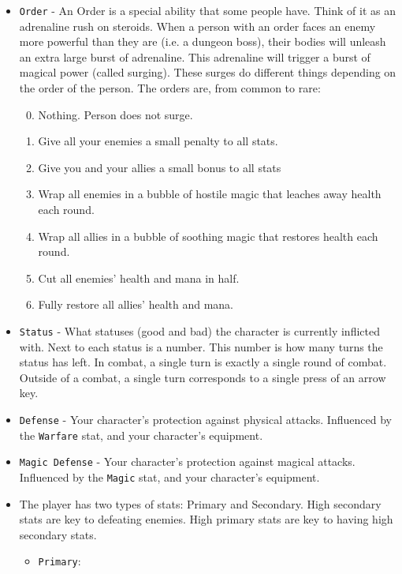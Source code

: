 \documentclass{report}
\begin{document}
\begin{itemize}
\begin{itemize}
    \item \verb|Order| - An Order is a special ability that some people have. Think
    of it as an adrenaline rush on steroids. When a person with an order faces
    an enemy more powerful than they are (i.e. a dungeon boss), their bodies will unleash an extra large
    burst of adrenaline. This adrenaline will trigger a burst of magical power 
    (called surging). These surges do different things depending on the order of
    the person. 
    The orders are, from common to rare:
    \begin{enumerate}
        \setcounter{enumi}{-1}
        \item Nothing. Person does not surge.
        \item Give all your enemies a small penalty to all stats.
        \item Give you and your allies a small bonus to all stats
        \item Wrap all enemies in a bubble of hostile magic that leaches away health 
        each round.
        \item Wrap all allies in a bubble of soothing magic that restores health
        each round.
        \item Cut all enemies' health and mana in half.
        \item Fully restore all allies' health and mana.
    \end{enumerate}
    \item \verb|Status| - What statuses (good and bad) the character is currently 
    inflicted with. Next to each status is a number. This number is how 
    many turns the status has left. In combat, a single turn is exactly a single
    round of combat. Outside of a combat, a single turn corresponds to a single
    press of an arrow key.
    \item \verb|Defense| - Your character's protection against physical attacks. 
    Influenced by the \verb|Warfare| stat, and your character's equipment.
    \item \verb|Magic Defense| - Your character's protection against magical 
    attacks.
    Influenced by the \verb|Magic| stat, and your character's equipment.
    \item The player has two types of stats: Primary and Secondary. High secondary stats are key to defeating enemies. High primary stats are key to having high secondary stats.
        \begin{itemize}
        \item \verb|Primary|:

\end{itemize}
\end{itemize}
\end{itemize}
\end{document}
